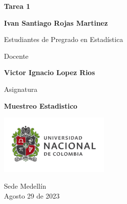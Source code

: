 \begin{titlepage}
   \Large{
   \begin{center}
       \vspace*{1cm}

       \textbf{Tarea 1}
       
       \vspace{1.5cm}
        
        
       
       \textbf{Ivan Santiago Rojas Martinez} \\
        
       \vspace{1cm}
       
       Estudiantes de Pregrado en Estadística
       
       \vspace{1cm}
       
       Docente
       
       \vspace{0.5cm}

       \textbf{Victor Ignacio Lopez Rios}
       
       \vspace{0.4cm}

       \vspace{1.5cm}
       
       Asignatura
       
       \vspace{0.5cm}

       \textbf{Muestreo Estadistico}

       \vfill

            
       \vspace{0.1cm}
     
       \includegraphics[width=0.4\textwidth]{DocumentFormat/logounal.png}
            
       Sede Medellín\\
       Agosto 29 de 2023
       
   \end{center}
   }
\end{titlepage}
